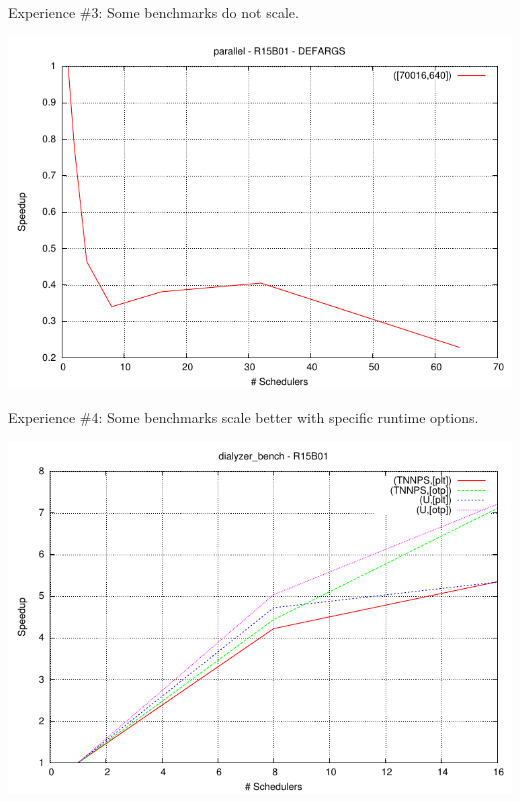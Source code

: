 \documentclass{beamer}
\begin{document}
\begin{frame}{Experience \#3: Some benchmarks do not scale.}
    \begin{center}
        \includegraphics[width=0.8\linewidth]{figures/parallel-speedup-bulldozer.pdf}
    \end{center}
\end{frame}

\begin{frame}{Experience \#4: Some benchmarks scale better with specific runtime options.}
    \begin{center}
        \includegraphics[width=0.8\linewidth]{figures/dialyzer_bench-speedup-bulldozer.pdf}
    \end{center}
\end{frame}
\end{document}
